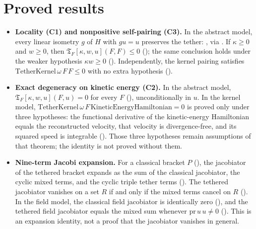 \documentclass[11pt]{article}
\begin{document}
\section{Proved results}
\begin{itemize}
\item \textbf{Locality (C1) and nonpositive self-pairing (C3).} In the abstract model, every linear isometry $g$ of $H$ with $gu=u$ preserves the tether: , via . If $\kappa\ge0$ and $w\ge0$, then $\mathfrak{T}_F[\kappa,w,u](F,F)\le0$ (); the same conclusion holds under the weaker hypothesis $\kappa w\ge0$ (). Independently, the kernel pairing satisfies $\mathrm{TetherKernel}\,\omega\,F\,F\le0$ with no extra hypothesis ().
\item \textbf{Exact degeneracy on kinetic energy (C2).} In the abstract model, $\mathfrak{T}_F[\kappa,w,u](F,u)=0$ for every $F$ (), unconditionally in $u$. In the kernel model, $\mathrm{TetherKernel}\,\omega\,F\,\mathrm{KineticEnergyHamiltonian}=0$ is proved only under three hypotheses: the functional derivative of the kinetic-energy Hamiltonian equals the reconstructed velocity, that velocity is divergence-free, and its squared speed is integrable (). Those three hypotheses remain assumptions of that theorem; the identity is not proved without them.
\item \textbf{Nine-term Jacobi expansion.} For a classical bracket $P$ (), the jacobiator of the tethered bracket expands as the sum of the classical jacobiator, the cyclic mixed terms, and the cyclic triple tether terms (). The tethered jacobiator vanishes on a set $R$ if and only if the mixed terms cancel on $R$ (). In the field model, the classical field jacobiator is identically zero (), and the tethered field jacobiator equals the mixed sum whenever $\mathrm{pr}\,u\,u\neq0$ (). This is an expansion identity, not a proof that the jacobiator vanishes in general.
\end{itemize}
\end{document}
